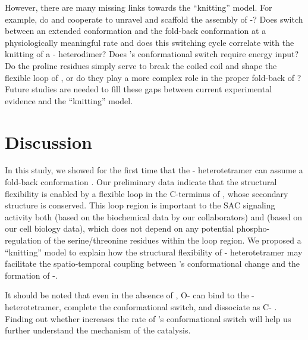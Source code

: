 However, there are many missing links towards the ``knitting'' model. For example, do  and  cooperate to unravel  and scaffold the assembly of -? Does  switch between an extended conformation and the fold-back conformation at a physiologically meaningful rate  and does this switching cycle correlate with the knitting of a - heterodimer? Does 's conformational switch require energy input? Do the proline residues simply serve to break the coiled coil and shape the flexible loop of , or do they play a more complex role in the proper fold-back of ? Future studies are needed to fill these gaps between current experimental evidence and the ``knitting'' model.

\section{Discussion}
\label{Chapter4Discussions}

In this study, we showed for the first time that the - heterotetramer can assume a fold-back conformation . Our preliminary data indicate that the structural flexibility is enabled by a flexible loop in the C-terminus of , whose secondary structure is conserved. This loop region is important to the SAC signaling activity both  (based on the biochemical data by our collaborators) and  (based on our cell biology data), which does not depend on any potential phospho-regulation of the serine/threonine residues within the loop region. We proposed a ``knitting'' model to explain how the structural flexibility of - heterotetramer may facilitate the spatio-temporal coupling between 's conformational change and the formation of -.

It should be noted that even in the absence of , O- can bind to the - heterotetramer, complete the conformational switch, and dissociate as C-  \cite{Yang2008}. Finding out whether  increases the rate of 's conformational switch will help us further understand the mechanism of the catalysis.

